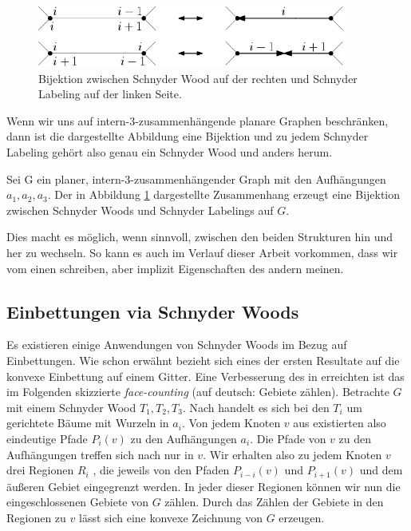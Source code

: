 \begin{figure}[h]
	\centering
  \includegraphics[width=0.9\textwidth]{schnyder_bij.png}
	\caption{Bijektion zwischen Schnyder Wood auf der rechten und Schnyder Labeling auf der linken Seite.}
	\label{schnyder_bij}
\end{figure}

Wenn wir uns auf intern-3-zusammenhängende planare Graphen beschränken, dann ist die dargestellte Abbildung eine Bijektion und zu jedem Schnyder Labeling gehört also genau ein Schnyder Wood und anders herum. 

\begin{theorem}
Sei G ein planer, intern-3-zusammenhängender Graph mit den Aufhängungen $a_1,a_2,a_3$. Der in Abbildung \ref{schnyder_bij} dargestellte Zusammenhang erzeugt eine Bijektion zwischen Schnyder Woods und Schnyder Labelings auf $G$.
\end{theorem}

Dies macht es möglich, wenn sinnvoll, zwischen den beiden Strukturen hin und her zu wechseln. So kann es auch im Verlauf dieser Arbeit vorkommen, dass wir vom einen schreiben, aber implizit Eigenschaften des andern meinen.

\subsection{Einbettungen via Schnyder Woods}\label{face_counting}

Es existieren einige Anwendungen von Schnyder Woods im Bezug auf Einbettungen. Wie schon erwähnt bezieht sich eines der ersten Resultate auf die konvexe Einbettung auf einem Gitter. Eine Verbesserung des in \cite{schnyder90} erreichten ist das im Folgenden skizzierte \textit{face-counting} \cite{felsner01} (auf deutsch: Gebiete zählen). Betrachte $G$ mit einem Schnyder Wood $T_1,T_2,T_3$. Nach \cite[Korollar 2.5]{felsner04} handelt es sich bei den $T_i$ um gerichtete Bäume mit Wurzeln in $a_i$. Von jedem Knoten $v$ aus existierten also eindeutige Pfade $P_i(v)$ zu den Aufhängungen $a_i$. Die Pfade von $v$ zu den Aufhängungen treffen sich nach \cite[Lemma 2.4]{felsner04} nur in $v$. Wir erhalten also zu jedem Knoten $v$ drei Regionen $R_i$ , die jeweils von den Pfaden $P_{i-i}(v)$ und $P_{i+1}(v)$ und dem äußeren Gebiet eingegrenzt werden. In jeder dieser Regionen können wir nun die eingeschlossenen Gebiete von $G$ zählen. Durch das Zählen der Gebiete in den Regionen zu $v$ lässt sich eine konvexe Zeichnung von $G$ erzeugen.

